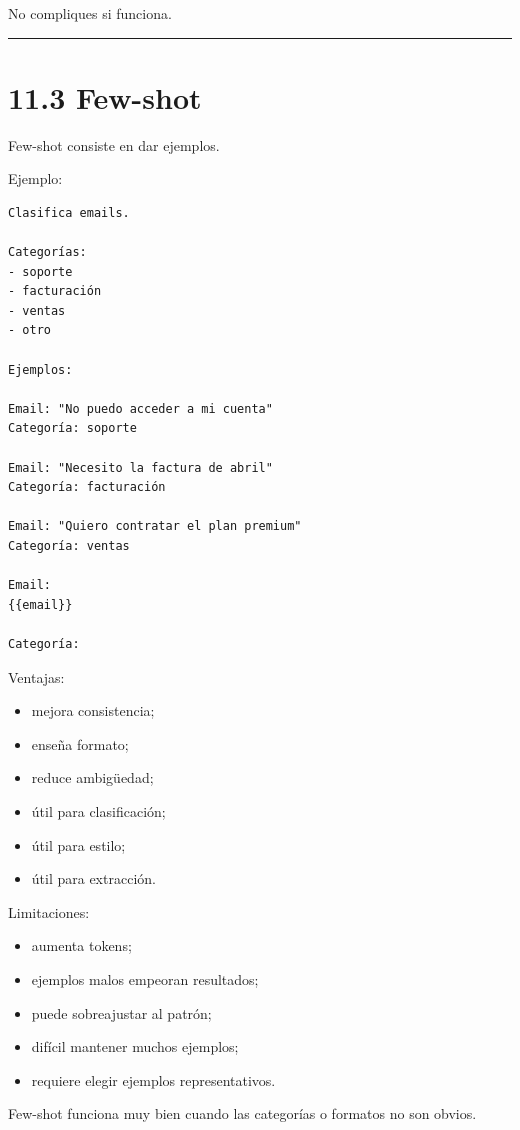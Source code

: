 No compliques si funciona.

\begin{center}\rule{0.5\linewidth}{0.5pt}\end{center}

\section{11.3 Few-shot}\label{few-shot}

Few-shot consiste en dar ejemplos.

Ejemplo:

\begin{lstlisting}
Clasifica emails.

Categorías:
- soporte
- facturación
- ventas
- otro

Ejemplos:

Email: "No puedo acceder a mi cuenta"
Categoría: soporte

Email: "Necesito la factura de abril"
Categoría: facturación

Email: "Quiero contratar el plan premium"
Categoría: ventas

Email:
{{email}}

Categoría:
\end{lstlisting}

Ventajas:

\begin{itemize}
\tightlist
\item
  mejora consistencia;
\item
  enseña formato;
\item
  reduce ambigüedad;
\item
  útil para clasificación;
\item
  útil para estilo;
\item
  útil para extracción.
\end{itemize}

Limitaciones:

\begin{itemize}
\tightlist
\item
  aumenta tokens;
\item
  ejemplos malos empeoran resultados;
\item
  puede sobreajustar al patrón;
\item
  difícil mantener muchos ejemplos;
\item
  requiere elegir ejemplos representativos.
\end{itemize}

Few-shot funciona muy bien cuando las categorías o formatos no son
obvios.

